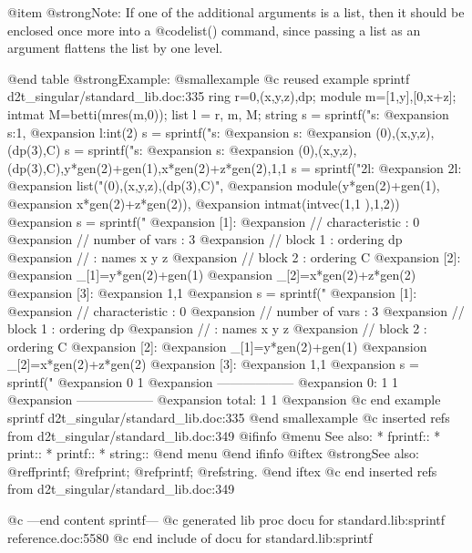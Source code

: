 {{{{{{{@item @strong{Note:}
If one of the additional arguments is a list, then it should be
enclosed once more into a @code{list()} command, since passing a list
as an argument flattens the list by one level.

@end table
@strong{Example:}
@smallexample
@c reused example sprintf d2t_singular/standard_lib.doc:335 
  ring r=0,(x,y,z),dp;
module m=[1,y],[0,x+z];
intmat M=betti(mres(m,0));
list l = r, m, M;
string s = sprintf("s:%
@expansion{} s:1,
@expansion{}  l:int(2)
s = sprintf("s:%
@expansion{} s:
@expansion{} (0),(x,y,z),(dp(3),C)
s = sprintf("s:%
@expansion{} s:
@expansion{} (0),(x,y,z),(dp(3),C),y*gen(2)+gen(1),x*gen(2)+z*gen(2),1,1 
s = sprintf("2l:%
@expansion{} 2l:
@expansion{} list("(0),(x,y,z),(dp(3),C)",
@expansion{} module(y*gen(2)+gen(1),
@expansion{} x*gen(2)+z*gen(2)),
@expansion{} intmat(intvec(1,1 ),1,2))
@expansion{} 
s = sprintf("%
@expansion{} [1]:
@expansion{}    //   characteristic : 0
@expansion{} //   number of vars : 3
@expansion{} //        block   1 : ordering dp
@expansion{} //                  : names    x y z 
@expansion{} //        block   2 : ordering C
@expansion{} [2]:
@expansion{}    _[1]=y*gen(2)+gen(1)
@expansion{}    _[2]=x*gen(2)+z*gen(2)
@expansion{} [3]:
@expansion{}    1,1 
@expansion{} 
s = sprintf("%
@expansion{} [1]:
@expansion{}    //   characteristic : 0
@expansion{} //   number of vars : 3
@expansion{} //        block   1 : ordering dp
@expansion{} //                  : names    x y z 
@expansion{} //        block   2 : ordering C
@expansion{} [2]:
@expansion{}    _[1]=y*gen(2)+gen(1)
@expansion{}    _[2]=x*gen(2)+z*gen(2)
@expansion{} [3]:
@expansion{}    1,1 
@expansion{} 
s = sprintf("%
@expansion{}            0     1
@expansion{} ------------------
@expansion{}     0:     1     1
@expansion{} ------------------
@expansion{} total:     1     1
@expansion{} 
@c end example sprintf d2t_singular/standard_lib.doc:335
@end smallexample
@c inserted refs from d2t_singular/standard_lib.doc:349
@ifinfo
@menu
See also:
* fprintf::
* print::
* printf::
* string::
@end menu
@end ifinfo
@iftex
@strong{See also:}
@ref{fprintf};
@ref{print};
@ref{printf};
@ref{string}.
@end iftex
@c end inserted refs from d2t_singular/standard_lib.doc:349

@c ---end content sprintf---
@c generated lib proc docu for standard.lib:sprintf reference.doc:5580 
@c end include of docu for standard.lib:sprintf

}}}}}}}
